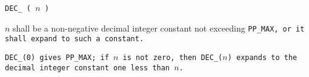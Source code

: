 
\tt{DEC_ (} $n$ \tt{)}


$n$ shall be a non-negative decimal integer constant not exceeding \tt{PP_MAX},
or it shall expand to such a constant.


\tt{DEC_(0)} gives \tt{PP_MAX}; if $n$ is not zero, then
\tt{DEC_(}$n$\tt{)} expands to the decimal integer constant one less than $n$.

